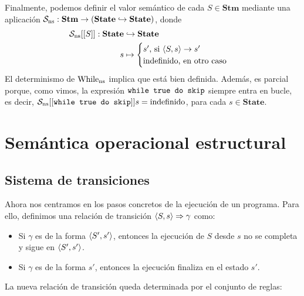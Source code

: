 Finalmente, podemos definir el valor semántico de cada $S \in \mathbf{Stm}$ mediante una aplicación
$\mathcal{S}_{\mathrm{ns}}: \mathbf{Stm} \rightarrow (\mathbf{State}\hookrightarrow\mathbf{State})$, donde
\begin{align*}
    \mathcal{S}_{\mathrm{ns}}[[S]]:  \mathbf{State} & \hookrightarrow  \mathbf{State} \\
                     s               & \mapsto          \begin{cases} s' \text{, si } \langle S, s \rangle\to s' \\ 
                        \mathrm{indefinido} \text{, en otro caso}
                        \end{cases}
\end{align*}
El determinismo de $\mathrm{While}_{\mathrm{ns}}$ implica que está bien definida. Además, es parcial porque, como vimos, la expresión $\texttt{while true do skip}$ siempre entra en bucle, es decir, $ \mathcal{S}_{\mathrm{ns}}[[\texttt{while true do skip}]]s = \mathrm{indefinido}$, para cada $s \in \mathbf{State}$.



\section{Semántica operacional estructural}

\subsection{Sistema de transiciones}

Ahora nos centramos en los pasos concretos de la ejecución de un programa. Para ello, definimos una relación de transición $\langle S, s \rangle \Rightarrow \gamma$ como:
\begin{itemize}
    \item Si $\gamma$ es de la forma $\langle S', s' \rangle$, entonces la ejecución de $S$ desde $s$ no se completa y sigue en $\langle S', s' \rangle$.
    \item Si $\gamma$ es de la forma $s'$, entonces la ejecución finaliza en el estado $s'$.
\end{itemize}
La nueva relación de transición queda determinada por el conjunto de reglas:

